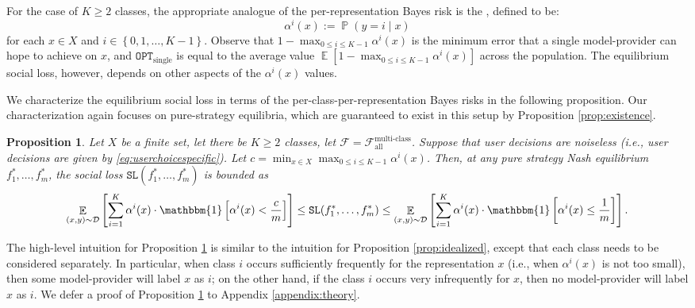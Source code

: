 \documentclass[letterpaper,11pt]{article}
\newtheorem{proposition}{Proposition}
\theoremstyle{plain}
\DeclareMathOperator*{\E}{\mathbb{E}}
\DeclareMathOperator*{\Prob}{\mathbb{P}}
\begin{document}
For the case of $K \ge 2$ classes, the appropriate  analogue of the per-representation Bayes risk is the , defined to be:
\begin{equation}
\label{eq:alphabayesclass}
 \alpha^i(x) := \Prob(y = i \mid x) 
\end{equation}
for each $x \in X$ and $i \in \left\{0,1,\ldots, K-1\right\}$. Observe that $1 - \max_{0 \le i \le K-1} \alpha^i(x)$ is the minimum error that a single model-provider can hope to achieve on $x$, and $\texttt{OPT}_{\text{single}}$ is equal to the average value $\E[1 - \max_{0 \le i \le K-1} \alpha^i(x)]$ across the population. The equilibrium social loss, however, depends on other aspects of the $\alpha^i(x)$ values. 

We characterize the equilibrium social loss in terms of the per-class-per-representation Bayes risks in the following proposition. Our characterization again focuses on  pure-strategy equilibria, which are guaranteed to exist in this setup by Proposition \ref{prop:existence}.
\begin{proposition}
\label{prop:idealizedmulticlass}
Let $X$ be a finite set, let there be $K \ge 2$ classes, let $\mathcal{F} = \mathcal{F}^{\text{multi-class}}_{\text{all}}$. Suppose that user decisions are noiseless (i.e., user decisions are given by \eqref{eq:userchoicespecific}). Let $c = \min_{x \in X} \max_{0 \le i \le K-1} \alpha^i(x)$. Then, at any pure strategy Nash equilibrium $f^*_1, \ldots, f^*_m$, the social loss $\texttt{SL}(f^*_1, \ldots, f^*_m)$ is bounded as
\begin{equation}
\label{eq:sociallossmulticlass} 
\E_{(x,y) \sim \mathcal{D}} \left[\sum_{i=1}^K \alpha^i(x) \cdot \mathbbm{1}\left[\alpha^i(x) < \frac{c}{m}\right] \right] \le \texttt{SL}(f^*_1, \ldots, f^*_m) \le  \E_{(x,y) \sim \mathcal{D}} \left[\sum_{i=1}^K \alpha^i(x) \cdot \mathbbm{1}\left[\alpha^i(x) \le \frac{1}{m} \right] \right]. 
\end{equation}
\end{proposition}

The high-level intuition for Proposition \ref{prop:idealizedmulticlass} is similar to the intuition for Proposition \ref{prop:idealized}, except that each class needs to be considered separately. In particular, when class $i$ occurs sufficiently frequently for the representation $x$ (i.e., when $\alpha^i(x)$ is not too small), then some model-provider will label $x$ as $i$; on the other hand, if the class $i$ occurs very infrequently for $x$, then no model-provider will label $x$ as $i$. We defer a proof of Proposition \ref{prop:idealizedmulticlass} to Appendix \ref{appendix:theory}.
\end{document}
